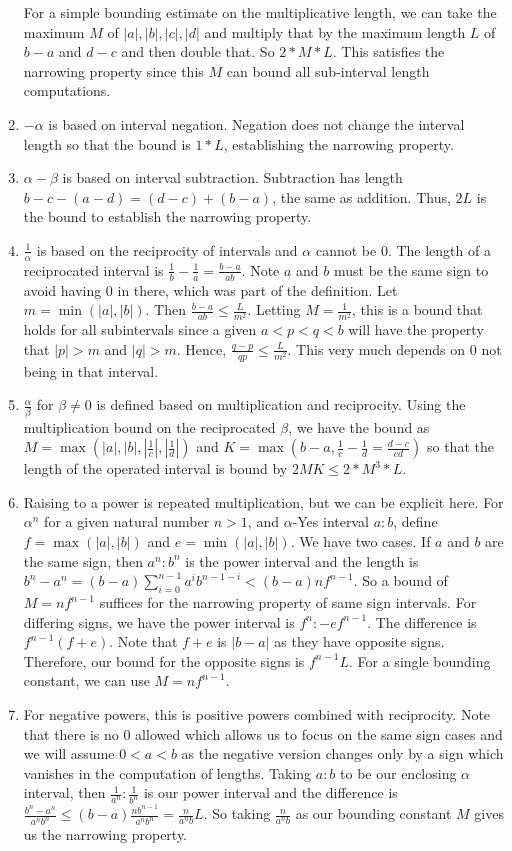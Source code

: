 \documentclass[12pt]{article}
\theoremstyle{remark}
\begin{document}
\begin{enumerate}
    For a simple bounding estimate on the multiplicative length, we can take the maximum $M$ of $|a|, |b|, |c|, |d|$ and multiply that by the maximum length $L$ of $b-a$ and $d-c$ and then double that. So $2*M*L$. This satisfies the narrowing property since this $M$ can bound all sub-interval length computations.
    \item $-\alpha$ is based on interval negation. Negation does not change the interval length so that the bound is $1*L$, establishing the narrowing property. 
    \item $\alpha - \beta$ is based on interval subtraction. Subtraction has length $b-c - (a-d) = (d-c) + (b-a)$, the same as addition. Thus, $2L$ is the bound to establish the narrowing property. 
    \item $\frac{1}{\alpha}$ is based on the reciprocity of intervals and $\alpha$ cannot be $0$. The length of a reciprocated interval is $\frac{1}{b} - \frac{1}{a} = \tfrac{b-a}{ab}$. Note $a$ and $b$ must be the same sign to avoid having 0 in there, which was part of the definition. Let $m = \min(|a|, |b|)$. Then $\tfrac{b-a}{ab} \leq \tfrac{L}{m^2}$. Letting $M = \tfrac{1}{m^2}$, this is a bound that holds for all subintervals since a given $a < p < q < b$ will have the property that $|p| > m$ and $|q| > m$. Hence, $\frac{q-p}{qp} \leq \frac{L}{m^2}$. This very much depends on $0$ not being in that interval. 
    \item $\tfrac{\alpha}{\beta}$ for $\beta \neq 0$ is defined based on multiplication and reciprocity. Using the multiplication bound on the reciprocated $\beta$, we have the bound as $M = \max(|a|, |b|, |\frac{1}{c}|, |\frac{1}{d}|)$ and $K= \max(b-a, \frac{1}{c} - \frac{1}{d}= \tfrac{d-c}{cd} )$ so that the length of the operated interval is bound by $2MK \leq 2*M^3*L$.
    \item Raising to a power is repeated multiplication, but we can be explicit here. For $\alpha^n$ for a given natural number $n>1$, and $\alpha$-Yes interval $a:b$, define $f = \max(|a|, |b|)$ and $e=\min(|a|,|b|)$.  We have two cases. If $a$ and $b$ are the same sign, then $a^n:b^n$ is the power interval and the length is $b^n - a^n = (b-a)\sum_{i=0}^{n-1} a^i b^{n-1-i} < (b-a)n f^{n-1}$. So a bound of $M= nf^{n-1}$ suffices for the narrowing property of same sign intervals. For differing signs, we have the power interval is $f^n:-ef^{n-1}$. The difference is $f^{n-1} (f+e)$. Note that $f+e$ is $|b-a|$ as they have opposite signs. Therefore, our bound for the opposite signs is $f^{n-1} L$. For a single bounding constant, we can use $M = n f^{n-1}$.
    \item For negative powers, this is positive powers combined with reciprocity. Note that there is no 0 allowed which allows us to focus on the same sign cases and we will assume $0 < a < b$ as the negative version changes only by a sign which vanishes in the computation of lengths.  Taking $a:b$ to be our enclosing $\alpha$ interval, then $\frac{1}{a^n} : \frac{1}{b^n}$ is our power interval and the difference is $\frac{b^n-a^n}{a^n b^n} \leq (b-a) \frac{n b^{n-1}}{a^n b^n} = \frac{n}{a^n b} L$. So taking $\frac{n}{a^n b}$ as our bounding constant $M$ gives us the narrowing property. 
\end{enumerate}
\end{document}
